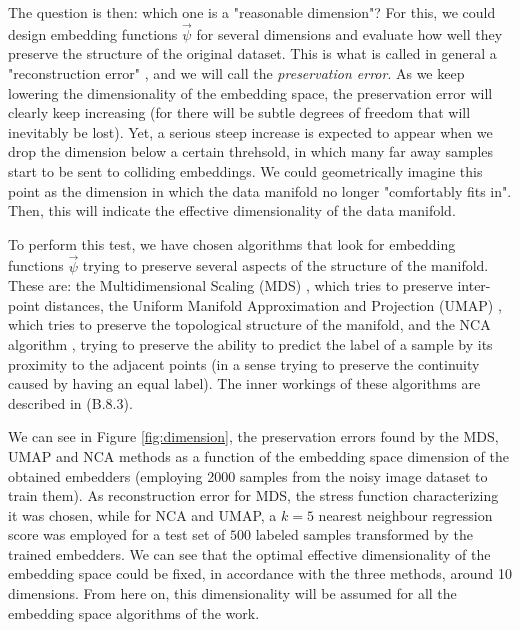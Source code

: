\documentclass[11pt, a4paper, twoside]{article} %
\begin{document}
The question is then: which one is a "reasonable dimension"? For this, we could design embedding functions $\vec{\psi}$ for several dimensions and evaluate how well they preserve the structure of the original dataset. This is what is called in general a "reconstruction error" \cite{manifold}, and we will call the {\em preservation error}. As we keep lowering the dimensionality of the embedding space, the preservation error will clearly keep increasing (for there will be subtle degrees of freedom that will inevitably be lost). Yet, a serious steep increase is expected to appear when we drop the dimension below a certain threhsold, in which many far away samples start to be sent to colliding embeddings. We could geometrically imagine this point as the dimension in which the data manifold no longer "comfortably fits in". Then, this will indicate the effective dimensionality of the data manifold.

To perform this test, we have chosen algorithms that look for embedding functions $\vec{\psi}$ trying to preserve several aspects of the structure of the manifold. These are: the Multidimensional Scaling (MDS) \cite{MDS}, which tries to preserve inter-point distances, the Uniform Manifold Approximation and Projection (UMAP) \cite{umap}, which tries to preserve the topological structure of the manifold, and the NCA algorithm \cite{NCA}, trying to preserve the ability to predict the label of a sample by its proximity to the adjacent points (in a sense trying to preserve the continuity caused by having an equal label). The inner workings of these algorithms are described in (B.8.3).



We can see in Figure \ref{fig:dimension}, the preservation errors found by the MDS, UMAP and NCA methods as a function of the embedding space dimension of the obtained embedders (employing 2000 samples from the noisy image dataset to train them). As reconstruction error for MDS, the stress function characterizing it was chosen, while for NCA and UMAP, a $k=5$ nearest neighbour regression score was employed for a test set of $500$ labeled samples transformed by the trained embedders. We can see that the optimal effective dimensionality of the embedding space could be fixed, in accordance with the three methods, around 10 dimensions. From here on, this dimensionality will be assumed for all the embedding space algorithms of the work.
\end{document}
